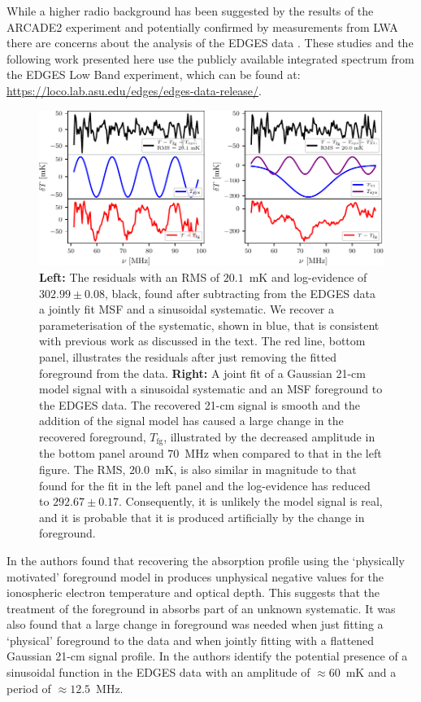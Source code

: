 While a higher radio background has been suggested by the results of the ARCADE2 experiment \citep{fixsen_arcade_2011} and potentially confirmed by measurements from LWA \citep{dowell_radio_2018} there are concerns about the analysis of the EDGES data \citep{Hills2018, Sims2020, Singh_edges_2019}. These studies and the following work presented here use the publicly available integrated spectrum from the EDGES Low Band experiment, which can be found at: \url{https://loco.lab.asu.edu/edges/edges-data-release/}.

\begin{figure}
    \centering
    \includegraphics{maxsmooth/figs/Figure11.pdf}
    \caption{\textbf{Left:} The residuals with an RMS of $20.1$~mK and log-evidence of $302.99\pm0.08$, black, found after subtracting from the EDGES data a jointly fit MSF and a sinusoidal systematic. We recover a parameterisation of the systematic, shown in blue, that is consistent with previous work as discussed in the text. The red line, bottom panel, illustrates the residuals after just removing the fitted foreground from the data. \textbf{Right:} A joint fit of a Gaussian 21-cm model signal with a sinusoidal systematic and an MSF foreground to the EDGES data. The recovered 21-cm signal is smooth and the addition of the signal model has caused a large change in the recovered foreground, $T_\mathrm{fg}$, illustrated by the decreased amplitude in the bottom panel around $70$~MHz when compared to that in the left figure. The RMS, $20.0$~mK, is also similar in magnitude to that found for the fit in the left panel and the log-evidence has reduced to $292.67\pm0.17$. Consequently, it is unlikely the model signal is real, and it is probable that it is produced artificially by the change in foreground.}
    \label{fig:EDGES_fits}
\end{figure}

In \cite{Hills2018} the authors found that recovering the absorption profile using the `physically motivated' foreground model in \cite{Bowman_edges_2018} produces unphysical negative values for the ionospheric electron temperature and optical depth. This suggests that the treatment of the foreground in \cite{Bowman_edges_2018} absorbs part of an unknown systematic. It was also found that a large change in foreground was needed when just fitting a `physical' foreground to the data and when jointly fitting with a flattened Gaussian 21-cm signal profile. In \cite{Hills2018} the authors identify the potential presence of a sinusoidal function in the EDGES data with an amplitude of $\approx 60$~mK and a period of $\approx 12.5$~MHz.

